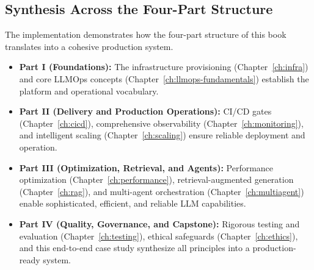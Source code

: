 \subsection{Synthesis Across the Four-Part Structure}
\label{sec:ishtar-four-part-synthesis}

The \ishtar{} implementation demonstrates how the four-part structure of this book translates into a cohesive production system. 
\begin{itemize}
    \item \textbf{Part I (Foundations):} The infrastructure provisioning (Chapter~\ref{ch:infra}) and core LLMOps concepts (Chapter~\ref{ch:llmops-fundamentals}) establish the platform and operational vocabulary.
    \item \textbf{Part II (Delivery and Production Operations):} CI/CD gates (Chapter~\ref{ch:cicd}), comprehensive observability (Chapter~\ref{ch:monitoring}), and intelligent scaling (Chapter~\ref{ch:scaling}) ensure reliable deployment and operation.
    \item \textbf{Part III (Optimization, Retrieval, and Agents):} Performance optimization (Chapter~\ref{ch:performance}), retrieval-augmented generation (Chapter~\ref{ch:rag}), and multi-agent orchestration (Chapter~\ref{ch:multiagent}) enable sophisticated, efficient, and reliable LLM capabilities.
    \item \textbf{Part IV (Quality, Governance, and Capstone):} Rigorous testing and evaluation (Chapter~\ref{ch:testing}), ethical safeguards (Chapter~\ref{ch:ethics}), and this end-to-end case study synthesize all principles into a production-ready system.
\end{itemize}

